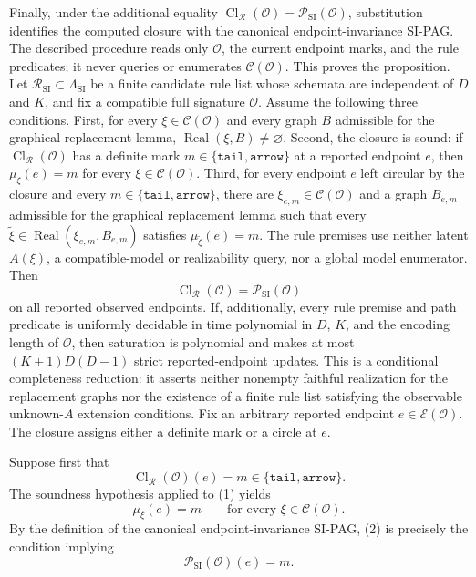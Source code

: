 Finally, under the additional equality \(\operatorname{Cl}_{\mathcal R}(\mathcal O)=\mathcal P_{\mathrm{SI}}(\mathcal O)\), substitution identifies the computed closure with the canonical endpoint-invariance SI-PAG. The described procedure reads only \(\mathcal O\), the current endpoint marks, and the rule predicates; it never queries or enumerates \(\mathcal C(\mathcal O)\). This proves the proposition.
Let \(\mathcal R_{\mathrm{SI}}\subset\Lambda_{\mathrm{SI}}\) be a finite candidate rule list whose schemata are independent of \(D\) and \(K\), and fix a compatible full signature \(\mathcal O\). Assume the following three conditions. First, for every \(\xi\in\mathcal C(\mathcal O)\) and every graph \(B\) admissible for the graphical replacement lemma, \(\operatorname{Real}(\xi,B)\ne\varnothing\). Second, the closure is sound: if \(\operatorname{Cl}_{\mathcal R}(\mathcal O)\) has a definite mark \(m\in\{\mathtt{tail},\mathtt{arrow}\}\) at a reported endpoint \(e\), then \(\mu_\xi(e)=m\) for every \(\xi\in\mathcal C(\mathcal O)\). Third, for every endpoint \(e\) left circular by the closure and every \(m\in\{\mathtt{tail},\mathtt{arrow}\}\), there are \(\xi_{e,m}\in\mathcal C(\mathcal O)\) and a graph \(B_{e,m}\) admissible for the graphical replacement lemma such that every \(\widetilde\xi\in\operatorname{Real}(\xi_{e,m},B_{e,m})\) satisfies \(\mu_{\widetilde\xi}(e)=m\). The rule premises use neither latent \(A(\xi)\), a compatible-model or realizability query, nor a global model enumerator. Then
\[
 \operatorname{Cl}_{\mathcal R}(\mathcal O)
 =\mathcal P_{\mathrm{SI}}(\mathcal O)
\]
on all reported observed endpoints. If, additionally, every rule premise and path predicate is uniformly decidable in time polynomial in \(D\), \(K\), and the encoding length of \(\mathcal O\), then saturation is polynomial and makes at most \((K+1)D(D-1)\) strict reported-endpoint updates. This is a conditional completeness reduction: it asserts neither nonempty faithful realization for the replacement graphs nor the existence of a finite rule list satisfying the observable unknown-\(A\) extension conditions.
Fix an arbitrary reported endpoint \(e\in\mathcal E(\mathcal O)\). The closure assigns either a definite mark or a circle at \(e\).

Suppose first that
\[
 \operatorname{Cl}_{\mathcal R}(\mathcal O)(e)
 =m\in\{\mathtt{tail},\mathtt{arrow}\}.
\tag{1}
\]
The soundness hypothesis applied to (1) yields
\[
 \mu_\xi(e)=m
 \qquad\text{for every }\xi\in\mathcal C(\mathcal O).
\tag{2}
\]
By the definition of the canonical endpoint-invariance SI-PAG, (2) is precisely the condition implying
\[
 \mathcal P_{\mathrm{SI}}(\mathcal O)(e)=m.
\tag{3}
\]

